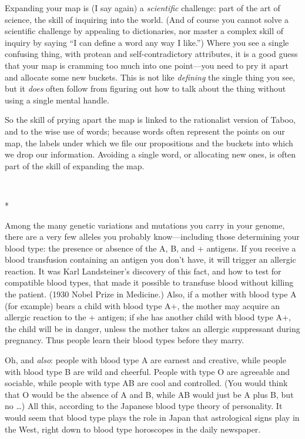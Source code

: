 {
 Expanding your map is (I say again) a \textit{scientific}
challenge: part of the art of science, the skill of inquiring into the
world. (And of course you cannot solve a scientific challenge by
appealing to dictionaries, nor master a complex skill of inquiry by
saying ``I can define a word any way I
like.'') Where you see a single confusing thing, with
protean and self-contradictory attributes, it is a good guess that your
map is cramming too much into one point---you need to pry it apart and
allocate some new buckets. This is not like \textit{defining} the
single thing you see, but it \textit{does} often follow from figuring
out how to talk about the thing without using a single mental handle.}

{
 So the skill of prying apart the map is linked to the rationalist
version of Taboo, and to the wise use of words; because words often
represent the points on our map, the labels under which we file our
propositions and the buckets into which we drop our information.
Avoiding a single word, or allocating new ones, is often part of the
skill of expanding the map.}

{\centering
 \ ~
\par}

{\centering
 *
\par}


{
 Among the many genetic variations and mutations you carry in your
genome, there are a very few alleles you probably know---including
those determining your blood type: the presence or absence of the A, B,
and + antigens. If you receive a blood transfusion containing an
antigen you don't have, it will trigger an allergic
reaction. It was Karl Landsteiner's discovery of this
fact, and how to test for compatible blood types, that made it possible
to transfuse blood without killing the patient. (1930 Nobel Prize in
Medicine.) Also, if a mother with blood type A (for example) bears a
child with blood type A+, the mother may acquire an allergic reaction
to the + antigen; if she has another child with blood type A+, the
child will be in danger, unless the mother takes an allergic
suppressant during pregnancy. Thus people learn their blood types
before they marry. }

{
 Oh, and \textit{also}: people with blood type A are earnest and
creative, while people with blood type B are wild and cheerful. People
with type O are agreeable and sociable, while people with type AB are
cool and controlled. (You would think that O would be the absence of A
and B, while AB would just be A plus B, but no \ldots) All this,
according to the Japanese blood type theory of personality. It would
seem that blood type plays the role in Japan that astrological signs
play in the West, right down to blood type horoscopes in the daily
newspaper.}

